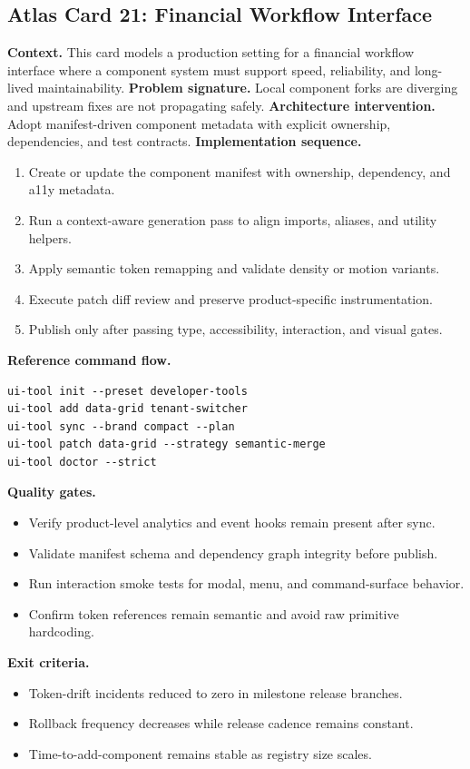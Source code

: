 \subsection*{Atlas Card 21: Financial Workflow Interface}
\textbf{Context.} This card models a production setting for a financial workflow interface where a component system must support speed, reliability, and long-lived maintainability.
\textbf{Problem signature.} Local component forks are diverging and upstream fixes are not propagating safely.
\textbf{Architecture intervention.} Adopt manifest-driven component metadata with explicit ownership, dependencies, and test contracts.
\textbf{Implementation sequence.}
\begin{enumerate}[leftmargin=*, itemsep=0.28em]
  \item Create or update the component manifest with ownership, dependency, and a11y metadata.
  \item Run a context-aware generation pass to align imports, aliases, and utility helpers.
  \item Apply semantic token remapping and validate density or motion variants.
  \item Execute patch diff review and preserve product-specific instrumentation.
  \item Publish only after passing type, accessibility, interaction, and visual gates.
\end{enumerate}
\textbf{Reference command flow.}
\begin{verbatim}
ui-tool init --preset developer-tools
ui-tool add data-grid tenant-switcher
ui-tool sync --brand compact --plan
ui-tool patch data-grid --strategy semantic-merge
ui-tool doctor --strict
\end{verbatim}
\textbf{Quality gates.}
\begin{itemize}[leftmargin=*, itemsep=0.24em]
  \item Verify product-level analytics and event hooks remain present after sync.
  \item Validate manifest schema and dependency graph integrity before publish.
  \item Run interaction smoke tests for modal, menu, and command-surface behavior.
  \item Confirm token references remain semantic and avoid raw primitive hardcoding.
\end{itemize}
\textbf{Exit criteria.}
\begin{itemize}[leftmargin=*, itemsep=0.24em]
  \item Token-drift incidents reduced to zero in milestone release branches.
  \item Rollback frequency decreases while release cadence remains constant.
  \item Time-to-add-component remains stable as registry size scales.
\end{itemize}
\clearpage
